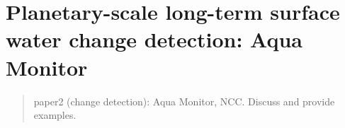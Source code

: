 \chapter{Planetary-scale long-term surface water change detection: Aqua Monitor}

\label{ch7}

\begin{abstract}
paper2 (change detection): Aqua Monitor, NCC.
Discuss and provide examples. 
\end{abstract}

\newpage
